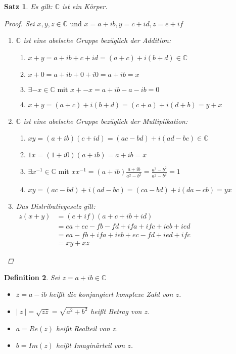 \documentclass[a4paper,titlepage,oneside]{article}
\def\C{\ensuremath{\mathbb{C}} }
\def\im{\ensuremath{\mathit{i}} }
\newcommand{\abs}[1]{\ensuremath{\left|\:#1\:\right|}}
\theoremstyle{thmstyle}
\newtheorem{satz}{Satz}[section]
\newtheorem{defi}[satz]{Definition}
\theoremstyle{subthmstyle}
\begin{document}
\newpage
\begin{satz}
Es gilt:  \C ist ein Körper.
\begin{proof} Sei \( x,y,z \in \C \text{ und } x = a + \im b, y = c + \im d, z = e + \im f \)
\begin{enumerate}[label=\Roman*)]
\item \C ist eine abelsche Gruppe bezüglich der Addition:
\begin{enumerate}[label=\roman*)]
\item \( x + y = a + \im b + c + \im d = (a+c) + \im (b + d) \in \C\)
\item \(x + 0 = a + \im b + 0 + \im 0 = a + \im b = x \)
\item \( \exists -x \in \C \text{ mit } x + -x = a + \im b - a -\im b = 0 \)
\item \( x+y =  (a+c) + \im (b + d) =  (c + a) + \im (d + b) = y + x \)
\end{enumerate}
\item \C ist eine abelsche Gruppe bezüglich der Multiplikation:
\begin{enumerate}[label=\roman*)]
\item \( xy = (a + \im b)(c + \im d) = (ac - bd) + \im (ad - bc) \in \C\)
\item \( 1x = (1+\im 0)(a + \im b ) = a + \im b = x \)
\item \( \exists x^{-1} \in \C \text{ mit } xx^{-1} = (a + \im b)\frac{a + \im b}{a^2 - b^2} = \frac{a^2 - b^2}{a^2 - b^2} = 1\)
\item \( xy = (ac - bd) + \im (ad - bc) = (ca - bd) + \im (da - cb) = yx\)
\end{enumerate}
\item Das Distributivgesetz gilt:\\
 \begin{math}\begin{aligned} z (x + y) &= (e + \im f)( a+c + \im b + \im d) \\
 &= ea + ec - fb - fd + \im fa +\im fc + \im eb + \im ed \\
 &= ea - fb + \im fa + \im eb + ec - fd + \im ed + \im fc \\
 &= xy + xz\end{aligned}\end{math}
\end{enumerate}
\end{proof}
\end{satz}

\begin{defi}
Sei \( z = a + \im b \in \C \)
\begin{itemize}
\item \(\overline{z} = a - \im b \) heißt die konjungiert komplexe Zahl von $z$.
\item \(\abs{z} = \sqrt{z \overline{z}} = \sqrt{a^2 + b^2}\) heißt Betrag von \(z\).
\item $a = Re(z)$ heißt Realteil von $z$.
\item $b = Im(z)$ heißt Imaginärteil von $z$.
\end{itemize}
\end{defi}
\end{document}

